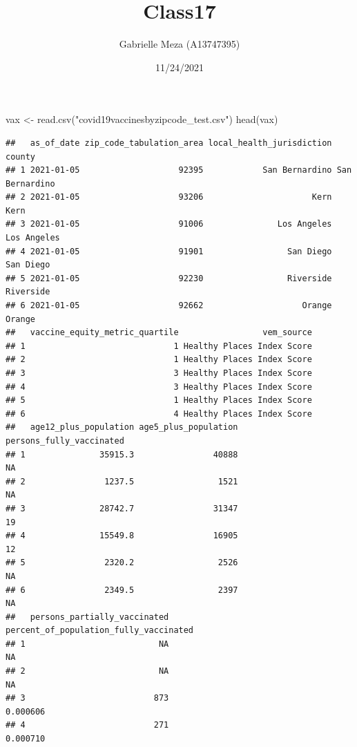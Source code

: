 \documentclass[
]{article}
\title{Class17}
\author{Gabrielle Meza (A13747395)}
\date{11/24/2021}
\newenvironment{Shaded}{\begin{snugshade}}{\end{snugshade}}
\newcommand{\FunctionTok}[1]{\textcolor[rgb]{0.00,0.00,0.00}{#1}}
\newcommand{\NormalTok}[1]{#1}
\newcommand{\OtherTok}[1]{\textcolor[rgb]{0.56,0.35,0.01}{#1}}
\newcommand{\StringTok}[1]{\textcolor[rgb]{0.31,0.60,0.02}{#1}}
\begin{document}
\maketitle

\begin{Shaded}
\begin{Highlighting}[]
\NormalTok{vax }\OtherTok{\textless{}{-}} \FunctionTok{read.csv}\NormalTok{(}\StringTok{"covid19vaccinesbyzipcode\_test.csv"}\NormalTok{)}
\FunctionTok{head}\NormalTok{(vax)}
\end{Highlighting}
\end{Shaded}

\begin{verbatim}
##   as_of_date zip_code_tabulation_area local_health_jurisdiction         county
## 1 2021-01-05                    92395            San Bernardino San Bernardino
## 2 2021-01-05                    93206                      Kern           Kern
## 3 2021-01-05                    91006               Los Angeles    Los Angeles
## 4 2021-01-05                    91901                 San Diego      San Diego
## 5 2021-01-05                    92230                 Riverside      Riverside
## 6 2021-01-05                    92662                    Orange         Orange
##   vaccine_equity_metric_quartile                 vem_source
## 1                              1 Healthy Places Index Score
## 2                              1 Healthy Places Index Score
## 3                              3 Healthy Places Index Score
## 4                              3 Healthy Places Index Score
## 5                              1 Healthy Places Index Score
## 6                              4 Healthy Places Index Score
##   age12_plus_population age5_plus_population persons_fully_vaccinated
## 1               35915.3                40888                       NA
## 2                1237.5                 1521                       NA
## 3               28742.7                31347                       19
## 4               15549.8                16905                       12
## 5                2320.2                 2526                       NA
## 6                2349.5                 2397                       NA
##   persons_partially_vaccinated percent_of_population_fully_vaccinated
## 1                           NA                                     NA
## 2                           NA                                     NA
## 3                          873                               0.000606
## 4                          271                               0.000710

\end{verbatim}
\end{document}

